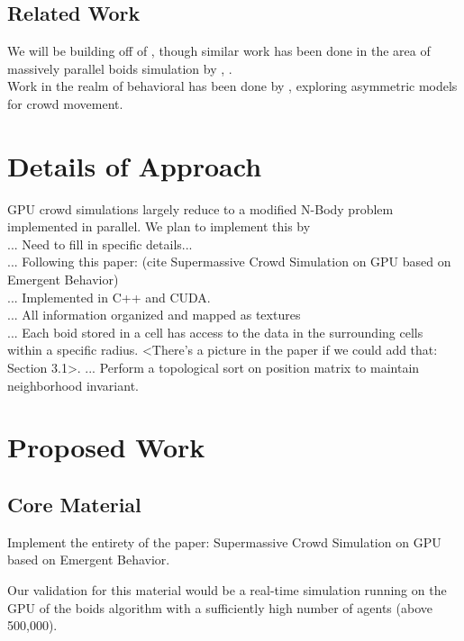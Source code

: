 \documentclass[cameraready]{acmsiggraph}  %
\begin{document}
\subsection*{Related Work}
We will be building off of \cite{passos2008}, though similar work has been done in the area of massively parallel boids simulation by \cite{silva2009boids}, \cite{erra2009efficient}.\\

Work in the realm of behavioral has been done by \cite{curtispedestrian}, exploring asymmetric models for crowd movement. 
\section{Details of Approach}

GPU crowd simulations largely reduce to a modified N-Body problem implemented in parallel.  We plan to implement this by \\
... Need to fill in specific details...\\
... Following this paper: (cite Supermassive Crowd Simulation on GPU based on Emergent Behavior)\\
... Implemented in C++ and CUDA.\\
... All information organized and mapped as textures\\
... Each boid stored in a cell has access to the data in the surrounding cells within a specific radius.  <There's a picture in the paper if we could add that: Section 3.1>.
... Perform a topological sort on position matrix to maintain neighborhood invariant.



\section{Proposed Work}


\subsection{Core Material}
Implement the entirety of the paper:  Supermassive Crowd Simulation on GPU based on Emergent Behavior.  \cite{passos2008}

Our validation for this material would be a real-time simulation running on the GPU of the boids algorithm with a sufficiently high number of agents (above 500,000).
\end{document}
